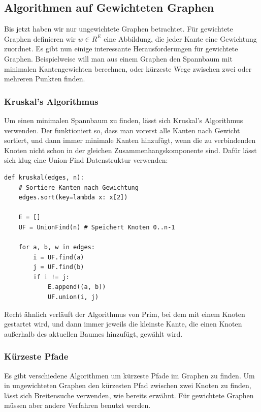 \subsection{Algorithmen auf Gewichteten Graphen}
Bis jetzt haben wir nur ungewichtete Graphen betrachtet.
Für gewichtete Graphen definieren wir \(w \in R^E\) eine Abbildung, die jeder Kante eine Gewichtung zuordnet.
Es gibt nun einige interessante Herausforderungen für gewichtete Graphen.
Beispielweise will man aus einem Graphen den Spannbaum mit minimalen Kantengewichten berechnen, oder kürzeste Wege zwischen zwei oder mehreren Punkten finden.

\subsubsection{Kruskal's Algorithmus}
Um einen minimalen Spannbaum zu finden, lässt sich Kruskal's Algorithmus verwenden.
Der funktioniert so, dass man vorerst alle Kanten nach Gewicht sortiert, und dann immer minimale Kanten hinzufügt, wenn die zu verbindenden Knoten nicht schon in der gleichen Zusammenhangskomponente sind.
Dafür lässt sich klug eine Union-Find Datenstruktur verwenden:
\begin{lstlisting}
def kruskal(edges, n):
    # Sortiere Kanten nach Gewichtung
    edges.sort(key=lambda x: x[2])

    E = []
    UF = UnionFind(n) # Speichert Knoten 0..n-1

    for a, b, w in edges:
        i = UF.find(a)
        j = UF.find(b)
        if i != j:
            E.append((a, b))
            UF.union(i, j)
\end{lstlisting}
Recht ähnlich verläuft der Algorithmus von Prim, bei dem mit einem Knoten gestartet wird, und dann immer jeweils die kleinste Kante, die einen Knoten außerhalb des aktuellen Baumes hinzufügt, gewählt wird.

\subsubsection{Kürzeste Pfade}
Es gibt verschiedene Algorithmen um kürzeste Pfade im Graphen zu finden.
Um in ungewichteten Graphen den kürzesten Pfad zwischen zwei Knoten zu finden, lässt sich Breitensuche verwenden, wie bereits erwähnt.
Für gewichtete Graphen müssen aber andere Verfahren benutzt werden.

